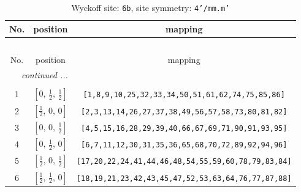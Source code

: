 \documentclass[fleqn,8pt]{jsarticle}
\begin{document}
\begin{longtable}{ccc}
\caption{Wyckoff site: {\tt 6b}, site symmetry: {\tt 4'/mm.m'}}
 \\
 \hline \hline
No. & position & mapping \\ \hline \endfirsthead

\multicolumn{2}{l}{\tablename\ \thetable{}} \\
 \hline \hline
No. & position & mapping \\ \hline \endhead

 \hline \hline
\multicolumn{2}{r}{\footnotesize\it continued ...} \\ \endfoot

 \hline \hline
\multicolumn{2}{r}{} \\ \endlastfoot

1 & $\left[ 0,\, \frac{1}{2},\, \frac{1}{2} \right]$ & {\tt [1,8,9,10,25,32,33,34,50,51,61,62,74,75,85,86]} \\ \hline
2 & $\left[ \frac{1}{2},\, 0,\, 0 \right]$ & {\tt [2,3,13,14,26,27,37,38,49,56,57,58,73,80,81,82]} \\ \hline
3 & $\left[ 0,\, 0,\, \frac{1}{2} \right]$ & {\tt [4,5,15,16,28,29,39,40,66,67,69,71,90,91,93,95]} \\ \hline
4 & $\left[ 0,\, \frac{1}{2},\, 0 \right]$ & {\tt [6,7,11,12,30,31,35,36,65,68,70,72,89,92,94,96]} \\ \hline
5 & $\left[ \frac{1}{2},\, 0,\, \frac{1}{2} \right]$ & {\tt [17,20,22,24,41,44,46,48,54,55,59,60,78,79,83,84]} \\ \hline
6 & $\left[ \frac{1}{2},\, \frac{1}{2},\, 0 \right]$ & {\tt [18,19,21,23,42,43,45,47,52,53,63,64,76,77,87,88]} \\
\end{longtable}
\renewcommand{\arraystretch}{1.2}
\end{document}
